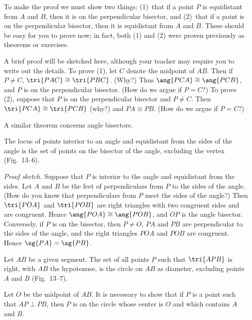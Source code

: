 \documentclass[11pt]{book}
\theoremstyle{bkplain}
\theoremstyle{XIplainnote}
\theoremstyle{bkplain}
\theoremstyle{bkplain}
\begin{document}
To make the proof we must show two things: (1)~that if a point $P$ is
equidistant from $A$ and $B$, then it is on the perpendicular bisector, and
(2)~that if a point is on the perpendicular bisector, then it is equidistant
from $A$ and $B$. These should be easy for you to prove now; in fact, both (1)
and (2) were proven previously as theorems or exercises.

A brief proof will be sketched here, although your teacher may require you to
write out the details. To prove (1), let $C$ denote the midpoint of $AB$. Then
if $P \neq C$, $\tri{PAC} \cong \tri{PBC}$. (Why?) Thus $\ang{PCA} \cong
\ang{PCB}$, and $P$ is on the perpendicular bisector. (How do we argue if
$P = C$?) To prove (2), suppose that $P$ is on the perpendicular bisector and
$P \neq C$. Then $\tri{PCA} \cong \tri{PCB}$ (why?) and $PA \cong PB$. (How do
we argue if $P = C$?)

A similar theorem concerns angle bisectors.

\begin{theorem}
The locus of points interior to an angle and equidistant from the sides of the
angle is the set of points on the bisector of the angle, excluding the vertex
(Fig.~13--6).
\end{theorem}

\FIGXIIISIX

\noindent\emph{Proof sketch.} Suppose that $P$ is interior to the angle and
equidistant from the sides. Let $A$ and $B$ be the feet of perpendiculars from
$P$ to the sides of the angle. (How do you know that perpendiculars from $P$
meet the sides of the angle?) Then $\tri{POA}$ and $\tri{POB}$ are right
triangles with two congruent sides and are congruent. Hence $\ang{POA} \cong
\ang{POB}$, and $OP$ is the angle bisector. Conversely, if $P$ is on the
bisector, then $P \neq O$, $PA$ and $PB$ are perpendicular to the sides of the
angle, and the right triangles $POA$ and $POB$ are congruent. Hence
$\sg{PA} = \sg{PB}$.

\begin{theorem}
Let $AB$ be a given segment. The set of all points $P$ such that $\tri{APB}$ is
right, with $AB$ the hypotenuse, is the circle on $AB$ as diameter, excluding
points $A$ and $B$ (Fig.~13--7).
\end{theorem}

\FIGXIIISEVEN

Let $O$ be the midpoint of $AB$. It is necessary to show that if $P$ is a point
such that $AP \perp PB$, then $P$ is on the circle whose center is $O$ and which
contains $A$ and $B$.
\end{document}
